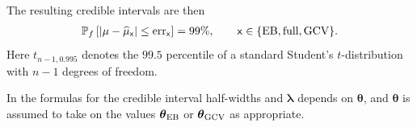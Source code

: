 \documentclass{svjour3}                     %
\newcommand{\bm}[1]{\boldsymbol{#1}}
\newcommand{\vlambda}{{\bm{\lambda}}}
\newcommand{\vtheta}{{\bm{\theta}}}
\newcommand{\hmu}{\widehat{\mu}}
\newcommand{\MLE}{\textup{EB}}
\newcommand{\full}{\textup{full}}
\newcommand{\GCV}{\textup{GCV}}
\newcommand{\err}{\textup{err}}
\begin{document}
\begin{theorem}
The resulting credible intervals are then
\begin{align}
\label{eqn_prob_CI}
\mathbb{P}_f \left[
|\mu-\hmu_{\mathsf{x}}| \leq \err_{\mathsf{x}} \right]  = 99\%, \qquad \mathsf{x} \in \{\MLE, \full, \GCV\}.
\end{align}
Here $t_{n-1,0.995}$ denotes the $99.5$ percentile of a standard Student's $t$-distribution with $n-1$ degrees of freedom.  

	In the formulas for the credible interval half-widths and $\vlambda$ depends on $\vtheta$, and  $\vtheta$ is assumed to take on the values $\vtheta_{\MLE}$ or $\vtheta_{\GCV}$ as appropriate.
\end{theorem}




















































\iffalse
\end{document}
